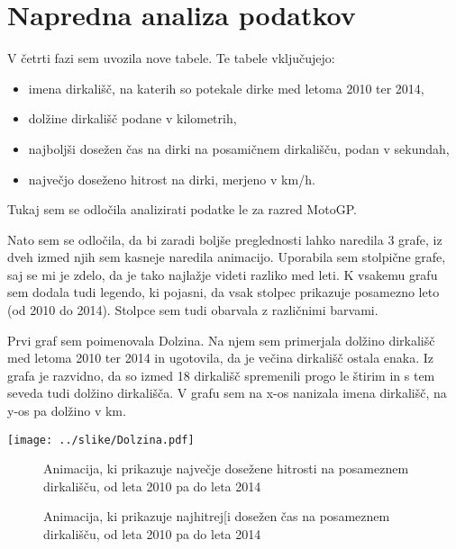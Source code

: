 \documentclass[11pt,a4paper]{article}
\begin{document}
\section{Napredna analiza podatkov}

V četrti fazi sem uvozila nove tabele. Te tabele vključujejo:
\begin{itemize} 
\item imena dirkališč, na katerih so potekale dirke med letoma 2010 ter 2014,
\item dolžine dirkališč podane v kilometrih,
\item najboljši dosežen čas na dirki na posamičnem dirkališču, podan v sekundah,
\item največjo doseženo hitrost na dirki, merjeno v km/h.
\end{itemize}
Tukaj sem se odločila analizirati podatke le za razred MotoGP.

Nato sem se odločila, da bi zaradi boljše preglednosti lahko naredila 3 grafe, iz dveh izmed njih sem kasneje naredila animacijo. Uporabila sem stolpične grafe, saj se mi je zdelo, da je tako najlažje videti razliko med leti. K vsakemu grafu sem dodala tudi legendo, ki pojasni, da vsak stolpec prikazuje posamezno leto (od 2010 do 2014). Stolpce sem tudi obarvala z različnimi barvami.

\newpage
Prvi graf sem poimenovala Dolzina. Na njem sem primerjala dolžino dirkališč med letoma 2010 ter 2014 in ugotovila, da je večina dirkališč ostala enaka. Iz grafa je razvidno, da so izmed 18 dirkališč spremenili progo le štirim in s tem seveda tudi dolžino dirkališča. V grafu sem na x-os nanizala imena dirkališč, na y-os pa dolžino v km.
\begin{center}
\texttt{[image: ../slike/Dolzina.pdf]}
\end{center}


\begin{figure}[H] 
\caption{Animacija, ki prikazuje največje dosežene hitrosti na posameznem dirkališču, od leta 2010 pa do leta 2014} 
\end{figure} 

\begin{figure}[H] 
\caption{Animacija, ki prikazuje najhitrej[i dosežen čas na posameznem dirkališču, od leta 2010 pa do leta 2014} 
\end{figure} 




 


\end{document}
